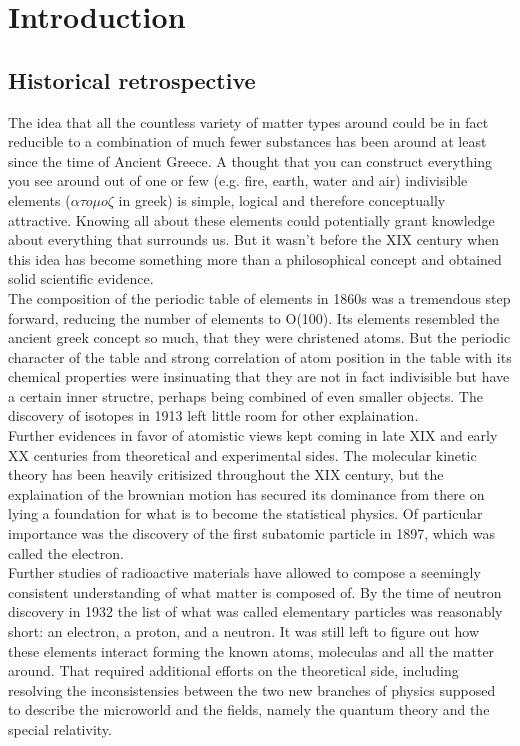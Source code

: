 \section{Introduction}

\subsection{Historical retrospective}
    The idea that all the countless variety of matter types around could be in fact reducible to a combination of much fewer substances has been around at least since the time of Ancient Greece. A thought that you can construct everything you see around out of one or few (e.g. fire, earth, water and air) indivisible elements ($\alpha \tau o \mu o \zeta$ in greek) is simple, logical and therefore conceptually attractive. Knowing all about these elements could potentially grant knowledge about everything that surrounds us. But it wasn't before the XIX century when this idea has become something more than a philosophical concept and obtained solid scientific evidence. \\
The composition of the periodic table of elements in 1860s\cite{mendel} was a tremendous step forward, reducing the number of elements to O(100). Its elements resembled the ancient greek concept so much, that they were christened atoms. But the periodic character of the table and strong correlation of atom position in the table with its chemical properties were insinuating that they are not in fact indivisible but have a certain inner structre, perhaps being combined of even smaller objects. The discovery of isotopes in 1913\cite{isotopes} left little room for other explaination.\\
Further evidences in favor of atomistic views kept coming in late XIX and early XX centuries from theoretical and experimental sides. The molecular kinetic theory has been heavily critisized throughout the XIX century, but the explaination of the brownian motion\cite{brownian} has secured its dominance from there on lying a foundation for what is to become the statistical physics. Of particular importance was the discovery of the first subatomic particle in 1897, which was called the electron\cite{cathode}. \\
Further studies of radioactive materials have allowed to compose a seemingly consistent understanding of what matter is composed of. By the time of neutron discovery in 1932\cite{neutron} the list of what was called elementary particles was reasonably short: an electron, a proton, and a neutron. It was still left to figure out how these elements interact forming the known atoms, moleculas and all the matter around. That required additional efforts on the theoretical side, including resolving the inconsistensies between the two new branches of physics supposed to describe the microworld and the fields, namely the quantum theory and the special relativity. \\
